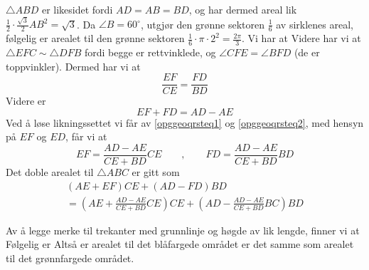 $ \triangle ABD $ er likesidet fordi $ AD=AB=BD $, og har dermed areal lik $ \frac{1}{2}\cdot \frac{\sqrt{3}}{2}AB^2=\sqrt{3} $. Da $ \angle B=60^\circ $, utgjør den grønne sektoren $ \frac{1}{6} $ av sirklenes areal, følgelig er arealet til den grønne sektoren $ \frac{1}{6}\cdot \pi\cdot2^2=\frac{2\pi}{3} $. Vi har at
Videre har vi at
$ {\triangle EFC \sim \triangle DFB} $ fordi begge er rettvinklede, og $ {\angle CFE = \angle BFD}$ (de er toppvinkler). Dermed har vi at
\begin{equation}\label{opggeoqrsteq1}
	\frac{EF}{CE}=\frac{FD}{BD} 
\end{equation}
Videre er
\begin{equation}\label{opggeoqrsteq2}
	EF+FD= AD-AE
\end{equation}
Ved å løse likningssettet vi får av \eqref{opggeoqrsteq1} og \eqref{opggeoqrsteq2}, med hensyn på $ EF $ og $ ED $, får vi at
\[ 
EF = \frac{AD-AE}{CE+BD}CE\qquad,\qquad  FD=\frac{AD-AE}{CE+BD}BD
\]
Det doble arealet til $ \triangle ABC $ er gitt som
\begin{multline*}
(AE+EF)CE+(AD-FD)BD \\=\left(AE+\frac{AD-AE}{CE+BD}CE\right)CE+\left(AD-\frac{AD-AE}{CE+BD}BC\right)BD	
\end{multline*}

\newpage
{}
Av å legge merke til trekanter med grunnlinje og høgde av lik lengde, finner vi at
Følgelig er
Altså er arealet til det blåfargede området er det samme som arealet til det grønnfargede området.
\newpage

